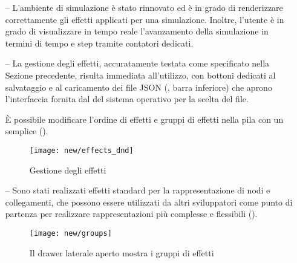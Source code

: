                 \begin{itemize}
                  \item[--]
                      L'ambiente di simulazione è stato rinnovato ed è in grado di renderizzare correttamente gli effetti applicati per una simulazione.
                      Inoltre, l'utente è in grado di visualizzare in tempo reale l'avanzamento della simulazione in termini di tempo e step tramite contatori dedicati.

                  \item[--]
                      La gestione degli effetti, accuratamente testata come specificato nella %
                      Sezione precedente, risulta immediata all'utilizzo, con bottoni dedicati al salvataggio e al caricamento dei file JSON (, barra inferiore) che aprono l'interfaccia fornita dal  del sistema operativo per la scelta del file.

                      È possibile modificare l'ordine di effetti e gruppi di effetti nella pila con un semplice  ().

                      \begin{figure}[htbp]
                          \centering
                          \texttt{[image: new/effects\_dnd]}
                          \caption{Gestione  degli effetti}
                          \label{fig:simWithDnD}
                      \end{figure}

                  \item[--]
                      Sono stati realizzati effetti standard per la rappresentazione di nodi e collegamenti, che possono essere utilizzati da altri sviluppatori come punto di partenza per realizzare rappresentazioni più complesse e flessibili ().

                      \begin{figure}[htbp]
                          \centering
                          \texttt{[image: new/groups]}
                          \caption{Il drawer laterale aperto mostra i gruppi di effetti}
                          \label{fig:simWithEff}
                      \end{figure}


\end{itemize}
